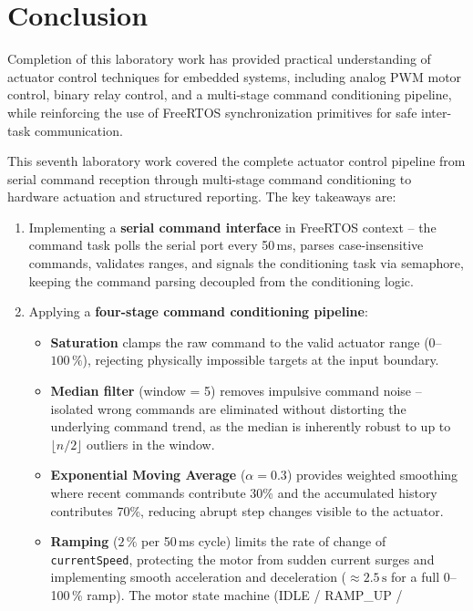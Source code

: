 \section{Conclusion}

Completion of this laboratory work has provided practical understanding of actuator
control techniques for embedded systems, including analog PWM motor control, binary
relay control, and a multi-stage command conditioning pipeline, while reinforcing the
use of FreeRTOS synchronization primitives for safe inter-task communication.

This seventh laboratory work covered the complete actuator control pipeline from serial
command reception through multi-stage command conditioning to hardware actuation and
structured reporting. The key takeaways are:

\begin{enumerate}
  \item Implementing a \textbf{serial command interface} in FreeRTOS context -- the
    command task polls the serial port every 50\,ms, parses case-insensitive commands,
    validates ranges, and signals the conditioning task via semaphore, keeping the
    command parsing decoupled from the conditioning logic.
  \item Applying a \textbf{four-stage command conditioning pipeline}:
    \begin{itemize}
      \item \textbf{Saturation} clamps the raw command to the valid actuator range
        ($0$--$100\,\%$), rejecting physically impossible targets at the input boundary.
      \item \textbf{Median filter} (window = 5) removes impulsive command noise --
        isolated wrong commands are eliminated without distorting the underlying
        command trend, as the median is inherently robust to up to
        $\lfloor n/2 \rfloor$ outliers in the window.
      \item \textbf{Exponential Moving Average} ($\alpha = 0.3$) provides weighted
        smoothing where recent commands contribute 30\% and the accumulated history
        contributes 70\%, reducing abrupt step changes visible to the actuator.
      \item \textbf{Ramping} ($2\,\%$ per 50\,ms cycle) limits the rate of change
        of \texttt{currentSpeed}, protecting the motor from sudden current surges and
        implementing smooth acceleration and deceleration ($\approx 2.5\,\mathrm{s}$
        for a full 0--100\,\% ramp). The motor state machine (IDLE / RAMP\_UP /

\end{itemize}
\end{enumerate}

